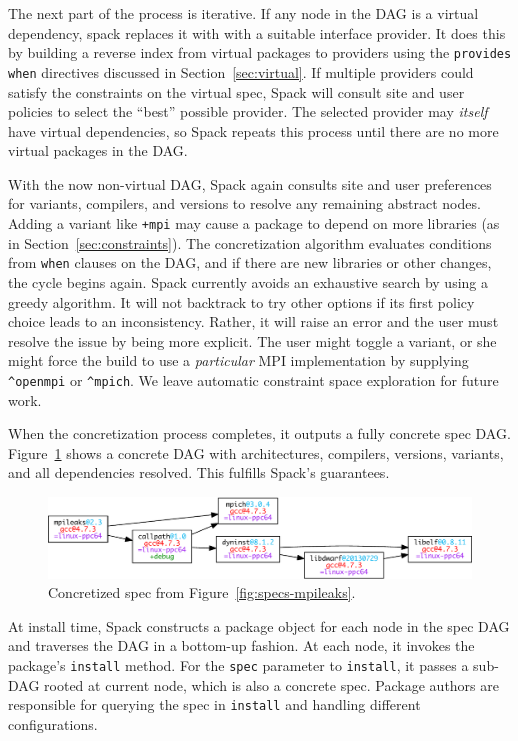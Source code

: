 The next part of the process is iterative.
If any node in the DAG is a virtual dependency, spack replaces it with with a
suitable interface provider.  It does this by building a reverse
index from virtual packages to providers using the {\tt provides when}
directives discussed in Section~\ref{sec:virtual}. If multiple providers
could satisfy the constraints on the virtual spec,
Spack will consult site and user policies to select the ``best'' possible
provider.  The selected provider may {\it itself} have virtual dependencies,
so Spack repeats this process until there are no more virtual packages
in the DAG.

With the now non-virtual DAG, Spack again consults site and user preferences for
variants, compilers, and versions to resolve any remaining abstract nodes.
Adding a variant like {\tt +mpi} may cause a package to depend on more
libraries (as in Section~\ref{sec:constraints}). The concretization algorithm
evaluates conditions from {\tt when} clauses on the DAG, and if there are
new libraries or other changes, the cycle begins again.
Spack currently avoids an exhaustive search by using a greedy algorithm.
It will not backtrack to try other options if its first policy choice leads
to an inconsistency.  Rather, it will raise an error and the user must resolve
the issue by being more explicit.  The user might toggle a variant, or she might
force the build to use a {\it particular} MPI implementation
by supplying \verb|^openmpi| or \verb|^mpich|.  We leave automatic constraint
space exploration for future work.

When the concretization process completes, it outputs a fully concrete spec DAG.
Figure~\ref{fig:specs-mpileaks-concrete} shows a concrete DAG with architectures,
compilers, versions, variants, and all dependencies resolved.
This fulfills Spack's guarantees.

\begin{figure}
	\centering
	\includegraphics[width=\columnwidth]{specs/mpileaks-concrete.pdf}
	\caption{
		Concretized spec from Figure~\ref{fig:specs-mpileaks}.
		\label{fig:specs-mpileaks-concrete}
	}
\end{figure}

At install time, Spack constructs a package object for each node in the spec DAG
and traverses the DAG in a bottom-up fashion.  At each node, it invokes the package's
{\tt install} method.  For the {\tt spec} parameter to {\tt install}, it passes
a sub-DAG rooted at current node, which is also a concrete spec.  Package authors are
responsible for querying the spec in {\tt install} and handling different configurations.

